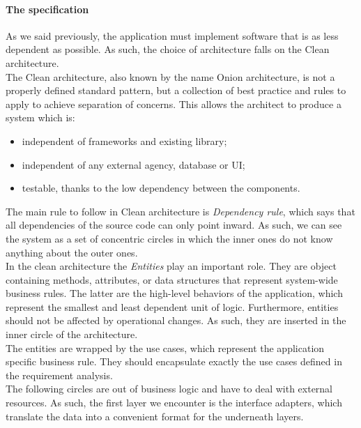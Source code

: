 \paragraph{The specification}
As we said previously, the application must implement software that is as less dependent as possible. As such, the choice of architecture falls on the Clean architecture. 
\\ The Clean architecture, also known by the name Onion architecture, is not a properly defined standard pattern, but a collection of best practice and rules to apply to achieve separation of concerns\cite{uncle_bob_2012}. This allows the architect to produce a system which is:
\begin{itemize}
    \item independent of frameworks and existing library;
    \item independent of any external agency, database or UI;
    \item testable, thanks to the low dependency between the components.
\end{itemize}
The main rule to follow in Clean architecture is \textit{Dependency rule}, which says that all dependencies of the source code can only point inward. As such, we can see the system as a set of concentric circles in which the inner ones do not know anything about the outer ones. 
\\ In the clean architecture the \textit{Entities} play an important role. They are object containing methods, attributes, or data structures that represent system-wide business rules. The latter are the high-level behaviors of the application, which represent the smallest and least dependent unit of logic. Furthermore, entities should not be affected by operational changes. As such, they are inserted in the inner circle of the architecture. 
\\ The entities are wrapped by the use cases, which represent the application specific business rule. They should encapsulate exactly the use cases defined in the requirement analysis.
\\ The following circles are out of business logic and have to deal with external resources. As such, the first layer we encounter is the interface adapters, which translate the data into a convenient format for the underneath layers.

